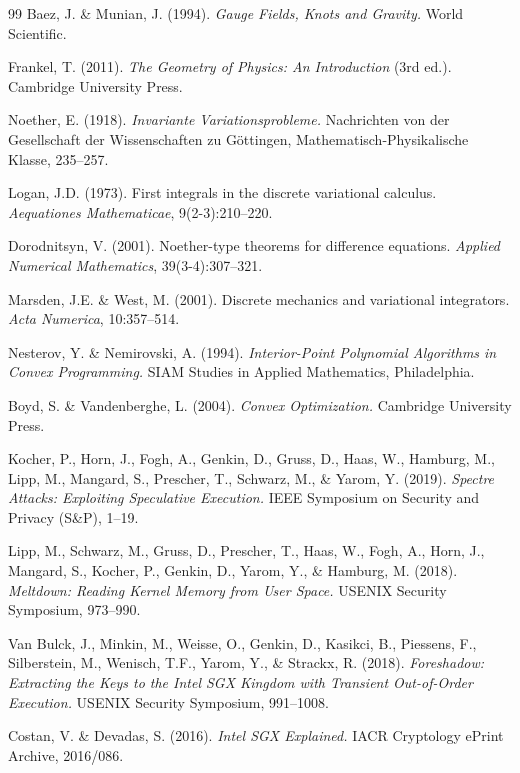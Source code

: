 \documentclass[11pt,letterpaper]{article}
\theoremstyle{definition}
\theoremstyle{remark}
\begin{document}
\begin{thebibliography}{99}
Baez, J. \& Munian, J. (1994). \emph{Gauge Fields, Knots and Gravity.} World Scientific.

Frankel, T. (2011). \emph{The Geometry of Physics: An Introduction} (3rd ed.). Cambridge University Press.

Noether, E. (1918). \emph{Invariante Variationsprobleme.} Nachrichten von der Gesellschaft der Wissenschaften zu G\"ottingen, Mathematisch-Physikalische Klasse, 235--257.

Logan, J.D. (1973). First integrals in the discrete variational calculus. \emph{Aequationes Mathematicae}, 9(2-3):210--220.

Dorodnitsyn, V. (2001). Noether-type theorems for difference equations. \emph{Applied Numerical Mathematics}, 39(3-4):307--321.

Marsden, J.E. \& West, M. (2001). Discrete mechanics and variational integrators. \emph{Acta Numerica}, 10:357--514.

Nesterov, Y. \& Nemirovski, A. (1994). \emph{Interior-Point Polynomial Algorithms in Convex Programming.} SIAM Studies in Applied Mathematics, Philadelphia.

Boyd, S. \& Vandenberghe, L. (2004). \emph{Convex Optimization.} Cambridge University Press.

Kocher, P., Horn, J., Fogh, A., Genkin, D., Gruss, D., Haas, W., Hamburg, M., Lipp, M., Mangard, S., Prescher, T., Schwarz, M., \& Yarom, Y. (2019). \emph{Spectre Attacks: Exploiting Speculative Execution.} IEEE Symposium on Security and Privacy (S\&P), 1--19.

Lipp, M., Schwarz, M., Gruss, D., Prescher, T., Haas, W., Fogh, A., Horn, J., Mangard, S., Kocher, P., Genkin, D., Yarom, Y., \& Hamburg, M. (2018). \emph{Meltdown: Reading Kernel Memory from User Space.} USENIX Security Symposium, 973--990.

Van Bulck, J., Minkin, M., Weisse, O., Genkin, D., Kasikci, B., Piessens, F., Silberstein, M., Wenisch, T.F., Yarom, Y., \& Strackx, R. (2018). \emph{Foreshadow: Extracting the Keys to the Intel SGX Kingdom with Transient Out-of-Order Execution.} USENIX Security Symposium, 991--1008.

Costan, V. \& Devadas, S. (2016). \emph{Intel SGX Explained.} IACR Cryptology ePrint Archive, 2016/086.


\end{thebibliography}
\end{document}
